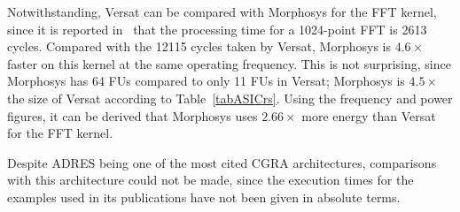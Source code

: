 Notwithstanding, Versat can be compared with Morphosys for the FFT
kernel, since it is reported in~\cite{Kamalizad03} that the processing
time for a 1024-point FFT is 2613 cycles. Compared with the 12115
cycles taken by Versat, Morphosys is $4.6\times$ faster on this kernel
at the same operating frequency. This is not surprising, since
Morphosys has 64 FUs compared to only 11 FUs in Versat; Morphosys is
$4.5\times$ the size of Versat according to
Table~\ref{tabASICrs}. Using the frequency and power figures, it can
be derived that Morphosys uses $2.66\times$ more energy than Versat
for the FFT kernel.

Despite ADRES being one of the most cited CGRA architectures,
comparisons with this architecture could not be made, since the
execution times for the examples used in its publications have not
been given in absolute terms.

